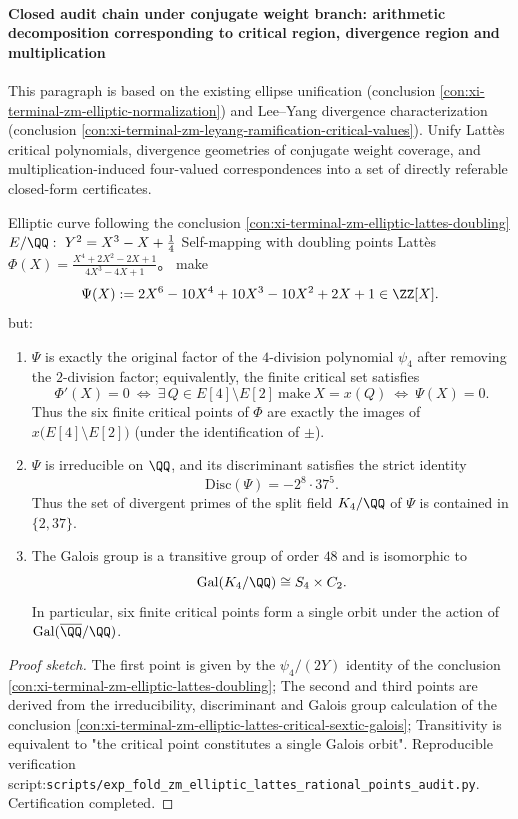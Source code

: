 \paragraph{Closed audit chain under conjugate weight branch: arithmetic decomposition corresponding to critical region, divergence region and multiplication}
This paragraph is based on the existing ellipse unification (conclusion \ref{con:xi-terminal-zm-elliptic-normalization}) and Lee--Yang divergence characterization (conclusion \ref{con:xi-terminal-zm-leyang-ramification-critical-values}).
Unify Latt\`es critical polynomials, divergence geometries of conjugate weight coverage, and multiplication-induced four-valued correspondences into a set of directly referable closed-form certificates.

\begin{conclusion}\label{con:xi-terminal-zm-lattes-critical-sextic-4division-splitting-field}
Elliptic curve following the conclusion \ref{con:xi-terminal-zm-elliptic-lattes-doubling}
\(
E/\QQ:\ Y^{2}=X^{3}-X+\tfrac14
\)
Self-mapping with doubling points Latt\`es
\(
\Phi(X)=\frac{X^{4}+2X^{2}-2X+1}{4X^{3}-4X+1}
\)。
make
\[
\Psi(X):=2X^{6}-10X^{4}+10X^{3}-10X^{2}+2X+1\in\ZZ[X].
\]
but:
\begin{enumerate}
\item \(\Psi\) is exactly the original factor of the \(4\)-division polynomial \(\psi_{4}\) after removing the \(2\)-division factor; equivalently, the finite critical set satisfies
  \[
  \Phi'(X)=0
  \ \Longleftrightarrow\
\exists\,Q\in E[4]\setminus E[2]\ \text{make}\ X=x(Q)
  \ \Longleftrightarrow\
  \Psi(X)=0.
  \]
Thus the six finite critical points of \(\Phi\) are exactly the images of \(x\bigl(E[4]\setminus E[2]\bigr)\) (under the identification of \(\pm\)).
\item \(\Psi\) is irreducible on \(\QQ\), and its discriminant satisfies the strict identity
  \[
  \mathrm{Disc}(\Psi)=-2^{8}\cdot 37^{5}.
  \]
Thus the set of divergent primes of the split field \(K_{4}/\QQ\) of \(\Psi\) is contained in \(\{2,37\}\).
\item The Galois group is a transitive group of order \(48\) and is isomorphic to
  \[
  \mathrm{Gal}(K_{4}/\QQ)\cong S_{4}\times C_{2}.
  \]
In particular, six finite critical points form a single orbit under the action of \(\mathrm{Gal}(\overline{\QQ}/\QQ)\).
\end{enumerate}
\end{conclusion}
\begin{proof}[Proof sketch]
The first point is given by the \(\psi_{4}/(2Y)\) identity of the conclusion \ref{con:xi-terminal-zm-elliptic-lattes-doubling};
The second and third points are derived from the irreducibility, discriminant and Galois group calculation of the conclusion \ref{con:xi-terminal-zm-elliptic-lattes-critical-sextic-galois};
Transitivity is equivalent to "the critical point constitutes a single Galois orbit".
Reproducible verification script:\texttt{scripts/exp\_fold\_zm\_elliptic\_lattes\_rational\_points\_audit.py}. Certification completed.
\end{proof}

